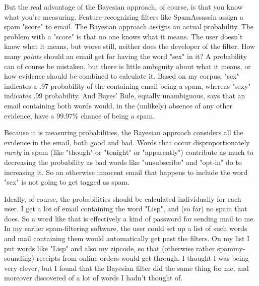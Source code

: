 But
                    the real advantage of the Bayesian approach, of course, is
                    that you know what you're measuring. Feature-recognizing
                    filters like SpamAssassin assign a spam "score" to email.
                    The Bayesian approach assigns an actual probability. The
                    problem with a "score" is that no one knows what it means.
                    The user doesn't know what it means, but worse still,
                    neither does the developer of the filter. How many
                    \emph{points} should an email get for having the word "sex"
                    in it? A probability can of course be mistaken, but there is
                    little ambiguity about what it means, or how evidence should
                    be combined to calculate it. Based on my corpus, "sex"
                    indicates a .97 probability of the containing email being a
                    spam, whereas "sexy" indicates .99 probability. And Bayes'
                    Rule, equally unambiguous, says that an email containing
                    both words would, in the (unlikely) absence of any other
                    evidence, have a 99.97\% chance of being a spam.

Because
                    it is measuring probabilities, the Bayesian approach
                    considers all the evidence in the email, both good and bad.
                    Words that occur disproportionately \emph{rarely} in spam
                    (like "though" or "tonight" or "apparently") contribute as
                    much to decreasing the probability as bad words like
                    "unsubscribe" and "opt-in" do to increasing it. So an
                    otherwise innocent email that happens to include the word
                    "sex" is not going to get tagged as spam.

Ideally,
                    of course, the probabilities should be calculated
                    individually for each user. I get a lot of email containing
                    the word "Lisp", and (so far) no spam that does. So a word
                    like that is effectively a kind of password for sending mail
                    to me. In my earlier spam-filtering software, the user could
                    set up a list of such words and mail containing them would
                    automatically get past the filters. On my list I put words
                    like "Lisp" and also my zipcode, so that (otherwise rather
                    spammy-sounding) receipts from online orders would get
                    through. I thought I was being very clever, but I found that
                    the Bayesian filter did the same thing for me, and moreover
                    discovered of a lot of words I hadn't thought of.

